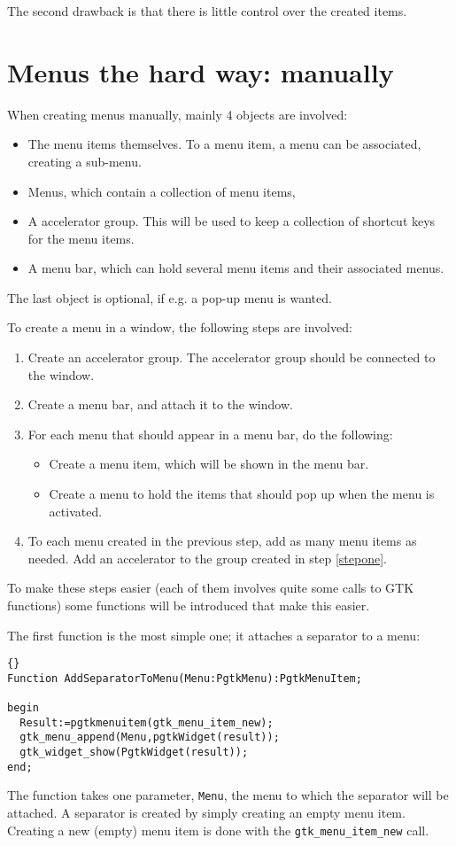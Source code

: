 \documentclass[10pt]{article}
\begin{document}
The second drawback is that there is little control over the created items.

\section{Menus the hard way: manually}
When creating menus manually, mainly 4 objects are involved:
\begin{itemize}
\item The menu items themselves. To a menu item, a menu can be associated,
creating a sub-menu.
\item Menus, which contain a collection of menu items,
\item A accelerator group. This will be used to keep a collection of
shortcut keys for the menu items.
\item A menu bar, which can hold several menu items and their associated
menus. 
\end{itemize}
The last object is optional, if e.g. a pop-up menu is wanted.

To create a menu in a window, the following steps are involved:
\begin{enumerate}
\item Create an accelerator group. The accelerator group should be
connected to the window. \label{stepone}
\item Create a menu bar, and attach it to the window.
\item For each menu that should appear in a menu bar, do the following:
\begin{itemize}
\item Create a menu item, which will be shown in the menu bar.
\item Create a menu to hold the items that should pop up when the menu is
activated.
\end{itemize}
\item To each menu created in the previous step, add as many menu items as
needed. Add an accelerator to the group created in step \ref{stepone}.
\end{enumerate}

To make these steps easier (each of them involves quite some calls to GTK
functions) some functions will be introduced that make this easier.

The first function is the most simple one; it attaches a separator to a
menu:
\begin{lstlisting}{}
Function AddSeparatorToMenu(Menu:PgtkMenu):PgtkMenuItem;

begin
  Result:=pgtkmenuitem(gtk_menu_item_new); 
  gtk_menu_append(Menu,pgtkWidget(result));
  gtk_widget_show(PgtkWidget(result));
end;
\end{lstlisting}
The function takes one parameter, \lstinline|Menu|, the menu to which the
separator will be attached. A separator is created by simply creating an
empty menu item. Creating a new (empty) menu item is done with the
\lstinline|gtk_menu_item_new| call. 
\end{document}
